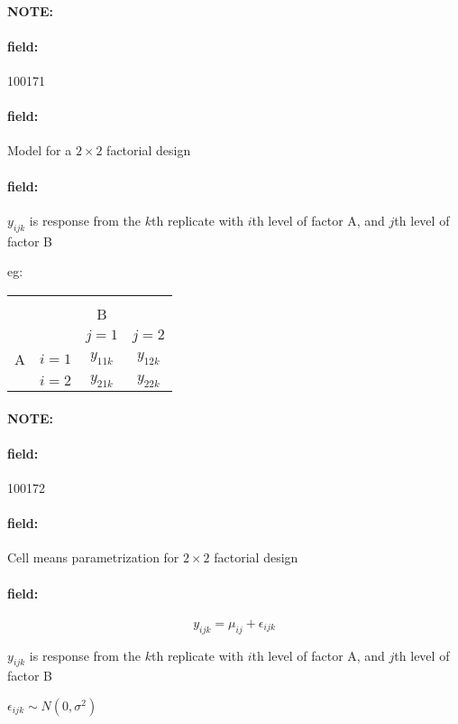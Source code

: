 \documentclass[12pt]{article}
\newenvironment{note}{\paragraph{NOTE:}}{}
\newenvironment{field}{\paragraph{field:}}{}
\begin{document}
\begin{note}
 \begin{field}
  \tiny 100171
 \end{field}
 \begin{field}
  Model for a $2\times 2$ factorial design
 \end{field}
 \begin{field}
  $y_{ijk}$ is response from the $k$th replicate with $i$th level of factor A, and $j$th level of factor B


  eg:

  \begin{center}
   \begin{tabular}{c c c c }
    \hline                              \\
      &         & B         &           \\
      &         & $j=1$     & $j = 2$   \\
    A & $i = 1$ & $y_{11k}$ & $y_{12k}$ \\
      & $i=2$   & $y_{21k}$ & $y_{22k}$ \\
   \end{tabular}
  \end{center}
 \end{field}
\end{note}


\begin{note}
 \begin{field}
  \tiny 100172
 \end{field}
 \begin{field}
  Cell means parametrization for $2 \times 2$ factorial design
 \end{field}
 \begin{field}
  $$y_{ijk} = \mu_{ij} + \epsilon_{ijk}$$



  $y_{ijk}$ is response from the $k$th replicate with $i$th level of factor A, and $j$th level of factor B

  $\epsilon_{ijk} \sim N(0,\sigma^2)$
 \end{field}
\end{note}
\end{document}
